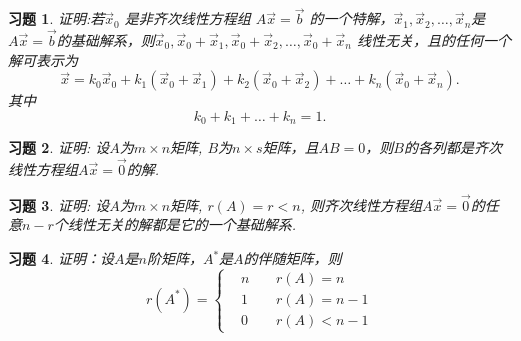 \documentclass[a4paper]{book}
\newtheorem{ex}{习题}[chapter]
\begin{document}
\begin{ex}\label{5.25}
证明:若$\vec{x}_0$ 是非齐次线性方程组 $A\vec{x}=\vec{b}$ 的一个特解，$\vec{x}_1,\vec{x}_2,…,\vec{x}_n$是$A\vec{x}=\vec{b}$的基础解系，则$\vec{x}_0,\vec{x}_0+\vec{x}_1,\vec{x}_0+\vec{x}_2,…,\vec{x}_0+\vec{x}_n$ 线性无关，且的任何一个解可表示为
$$\vec{x}=k_0 \vec{x}_0+k_1 (\vec{x}_0+\vec{x}_1 )+k_2 (\vec{x}_0+\vec{x}_2 )+\dots+k_n (\vec{x}_0+\vec{x}_n ).$$
其中$$k_0+k_1+\dots+k_n=1.$$
\end{ex}

\begin{ex}\label{5.26}
证明: 设$A$为$m\times n$矩阵, $B$为$n\times s$矩阵，且$AB=0$，则$B$的各列都是齐次线性方程组$A\vec{x}=\vec{0}$的解.
\end{ex}

\begin{ex}\label{5.27}
证明: 设$A$为$m\times n$矩阵, $r(A)=r<n$, 则齐次线性方程组$A\vec{x}=\vec{0}$的任意$n-r$个线性无关的解都是它的一个基础解系.
\end{ex}

\begin{ex}\label{5.28}
证明：设$A$是$n$阶矩阵，$A^{*}$是$A$的伴随矩阵，则
\begin{displaymath}
r(A^{*} )=\left\{\begin{aligned}&n\ \ \ \ \ &r(A)=n\\ &1 &r(A)=n-1\\ &0 &r(A)<n-1\end{aligned}\right.\end{displaymath}
\end{ex}
\end{document}
